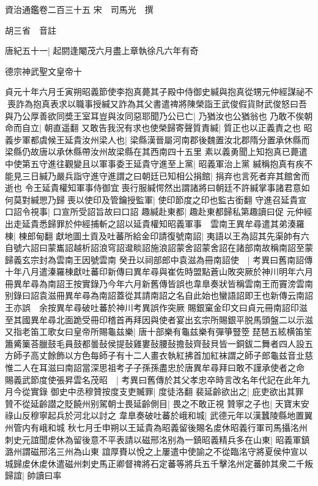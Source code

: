資治通鑑卷二百三十五
宋　司馬光　撰

胡三省　音註

唐紀五十一|{
	起閼逢閹茂六月盡上章執徐凡六年有奇}


德宗神武聖文皇帝十

貞元十年六月壬寅朔昭義節使李抱真薨其子殿中侍御史緘與抱真從甥元仲經謀祕不喪詐為抱真表求以職事授緘又詐為其父書遣禆將陳榮詣王武俊假貨財武俊怒曰吾與乃公厚善欲同奬王室耳豈與汝同惡耶聞乃公已亡|{
	乃猶汝也公猶翁也}
乃敢不俟朝命而自立|{
	朝直遥翻}
又敢告我況有求也使榮歸寄聲質責緘|{
	質正也以正義責之也}
昭義步軍都虞候王延貴汝州梁人也|{
	梁縣漢晉屬河南郡後魏置汝北郡隋分置承休縣而梁縣仍故唐以承休縣帶汝州故梁縣在其西南四十五里}
素以義勇聞上知抱真已薨遣中使第五守進往觀變且以軍事委王延貴守進至上黨|{
	昭義軍治上黨}
緘稱抱真有疾不能見三日緘乃嚴兵詣守進守進謂之曰朝廷已知相公捐館|{
	捐弃也言死者弃其館舍而逝也}
令王延貴權知軍事侍御宜喪行服緘愕然出謂諸將曰朝廷不許緘掌事諸君意如何莫對緘愳乃歸喪以使印及管鑰授監軍|{
	使印節度之印也監古銜翻}
守進召延貴宣口詔令視事|{
	口宣所受詔旨故曰口詔}
趣緘赴東都|{
	趣赴東都歸私第趣讀曰促}
元仲經出走延貴悉歸罪於仲經捕斬之詔以延貴權知昭義軍事　雲南王異牟尋遣其弟湊羅棟|{
	棟郎甸翻}
獻地圖土貢及吐蕃所給金印請復號南詔|{
	夷語以王為詔其先渠帥有六自號六詔曰蒙巂詔越析詔浪穹詔邆睒詔施浪詔蒙舍詔蒙舍詔在諸部南故稱南詔至蒙歸義玄宗封為雲南王因號雲南}
癸丑以祠部郎中袁滋為冊南詔使　|{
	考異曰舊南詔傳十年八月遣溱羅棟獻吐蕃印新傳曰異牟尋與崔佐時盟點蒼山敗突厥於神川明年六月冊異牟尋為南詔王按實錄乃今年六月新舊傳皆誤也韋臯奏狀皆稱雲南王而竇滂雲南别錄曰詔袁滋冊異牟尋為南詔蓋從其請南詔之名自此始也蠻語詔即王也新傳云南詔王亦誤　余按異牟尋破吐蕃於神川考異誤作突厥}
賜銀窠金印文曰貞元冊南詔印滋至其國異牟尋北面跪受冊印稽首再拜因與使者宴出玄宗所賜銀平脱馬頭盤二以示滋又指老笛工歌女曰皇帝所賜龜兹樂|{
	唐十部樂有龜兹樂有彈箏豎箜琵琶五絃横笛笙簫觱篥荅臘鼓毛員鼓都曇鼔侯提鼔雞婁鼔腰鼔擔鼔齊鼔貝皆一銅鈸二舞者四人設五方師子高丈餘飾以方色每師子有十二人畫衣執紅拂首加紅袜謂之師子郎龜兹音㐀慈}
惟二人在耳滋曰南詔當深思祖考子子孫孫盡忠於唐異牟尋拜曰敢不謹承使者之命　賜義武節度使張昇雲名茂昭　|{
	考異曰舊傳於其父孝忠卒時言改名年代記在此年九月今從實錄}
御史中丞穆贊按度支吏贓罪|{
	度徒洛翻}
裴延齡欲出之|{
	庇吏欲出其罪}
贊不從延齡譛之貶饒州别駕朝士畏延齡側目|{
	畏之不敢正視}
贊寧之子也|{
	天寶末安祿山反穆寧起兵於河北以討之}
韋臯奏破吐蕃於峨和城|{
	武德元年以漢蠶陵縣地置翼州管内有峨和城}
秋七月壬申朔以王延貴為昭義留後賜名䖍休昭義行軍司馬攝洺州刺史元誼聞䖍休為留後意不平表請以磁邢洺别為一鎮昭義精兵多在山東|{
	昭義軍鎮潞州謂磁邢洺三州為山東}
誼厚賚以悅之上屢遣中使諭之不從臨洺守將夏侯仲宣以城歸䖍休䖍休遣磁州刺史馬正卿督禆將石定蕃等將兵五千擊洺州定蕃帥其衆二千叛歸誼|{
	帥讀曰率}
